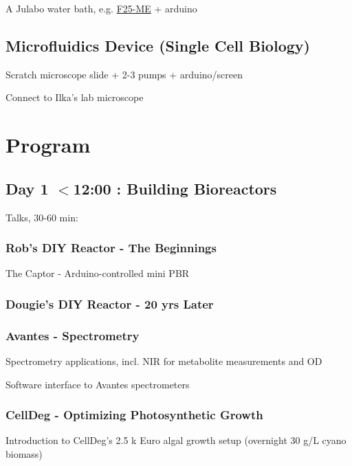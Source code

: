 \documentclass[12pt,a4paper]{article}
\begin{document}
A Julabo water bath,
e.g. \href{http://www.laborhandel24.de/9162625-de?utm_source=google_shopping&gclid=Cj0KEQiA496zBRDoi5OY3p2xmaUBEiQArLNnK6uWkryhjvkNdmRLgcg2W_HIO9W1aKaKCO9gmvlkt_MaAmhe8P8HAQ}{F25-ME}
+ arduino

\subsection{Microfluidics Device (Single Cell Biology)} 
\label{micro}

Scratch microscope slide + 2-3 pumps + arduino/screen

Connect to Ilka's lab microscope


\newpage

\section{Program}

\subsection{Day 1 $<$12:00 : Building Bioreactors}

Talks, 30-60 min:

\subsubsection{Rob's DIY Reactor - The Beginnings}

The Captor - Arduino-controlled mini PBR

\subsubsection{Dougie's DIY Reactor - 20 yrs Later}
\subsubsection{Avantes - Spectrometry}

Spectrometry applications, incl. NIR for metabolite measurements and OD

Software interface to Avantes spectrometers

\subsubsection{CellDeg - Optimizing Photosynthetic Growth}

Introduction to CellDeg's 2.5 k Euro algal growth setup (overnight 30 g/L
cyano biomass)
\end{document}
